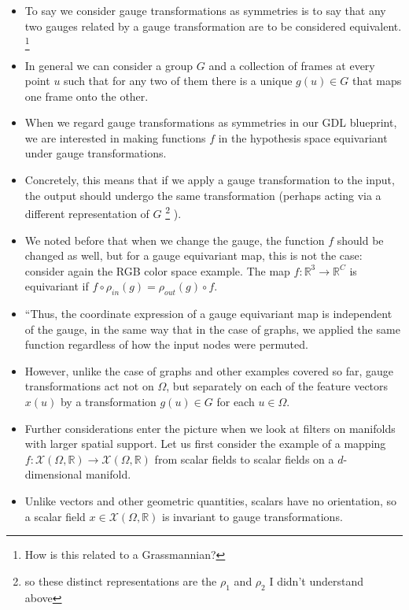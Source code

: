 \documentclass[12pt]{article}
\numberwithin{equation}{section}
\theoremstyle{definition}
\newcommand{		\R		}	{	\mathbb{R}				}
\newcommand{		\cX		}	{	\mathcal{X}				}
\newcommand{		\Oh		}	{	\Omega					}
\newcommand{		\1		}	{	\bm{1}					}%
\begin{document}
\begin{itemize}
\item To say we consider gauge transformations as symmetries is to say that any two gauges related by a gauge transformation are to be considered equivalent. \footnote{How is this related to a Grassmannian?}
\item In general we can consider a group $G$ and a collection of frames at every point $u$ such that for any two of them there is a unique $g(u) \in G$ that maps one frame onto the other. 
\item When we regard gauge transformations as symmetries in our GDL blueprint, we are interested in making functions $f$ in the hypothesis space equivariant under gauge transformations.
\item Concretely, this means that if we apply a gauge transformation to the input, the output should undergo the same transformation (perhaps acting via a different representation of $G$ \footnote{so these distinct representations are the $\rho_1$ and $\rho_2$ I didn't understand above} ). 
\item We noted before that when we change the gauge, the function $f$ should be changed as well, but for a gauge equivariant map, this is not the case:  consider again the RGB color space example. The map $f : \mathbb{R}^3 \to \mathbb{R}^C$ is equivariant if $f \circ \rho_{in}(g) = \rho_{out}(g) \circ f$.
\item ``Thus, the coordinate expression of a gauge equivariant map is independent of the gauge, in the same way that in the case of graphs, we applied the same function regardless of how the input nodes were permuted.

\item However, unlike the case of graphs and other examples covered so far, gauge transformations act not on $\Oh$, but separately on each of the feature vectors $x(u)$ by a transformation $g(u) \in G$ for each $u \in \Oh$. 

\item Further considerations enter the picture when we look at filters on manifolds with larger spatial support. Let us first consider the example of a mapping $f : \cX(\Oh, \R) \to \cX(\Oh, \R)$ from scalar fields to scalar fields on a $d$-dimensional manifold. 

\item Unlike vectors and other geometric quantities, scalars have no orientation, so a scalar field $x \in \cX(\Oh,\R)$ is invariant to gauge transformations. 


\end{itemize}
\end{document}
